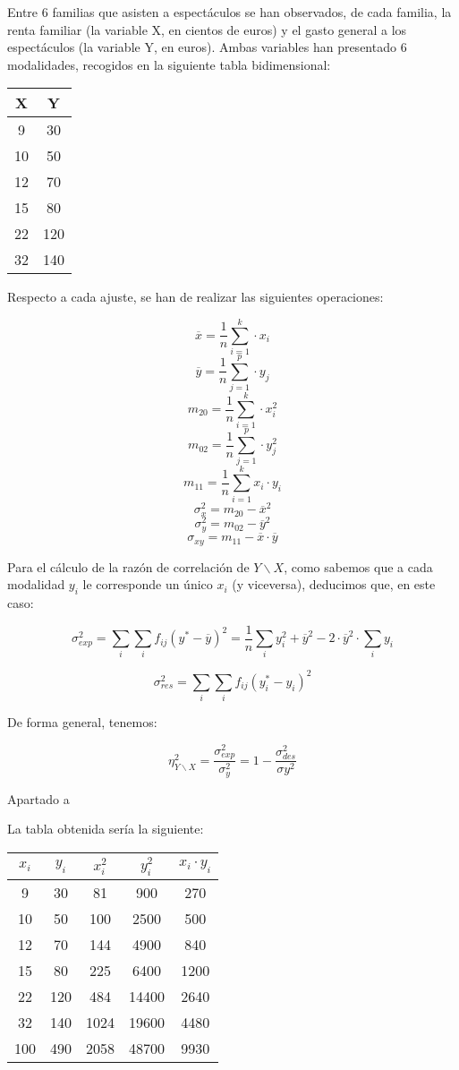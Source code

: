 \documentclass{article}
\begin{document}
Entre 6 familias que asisten a espectáculos se han observados, de cada familia, la renta familiar (la variable X, en cientos de euros) y el gasto general a los espectáculos (la variable Y, en euros). Ambas variables han presentado 6 modalidades, recogidos en la siguiente tabla bidimensional: 

\begin{center}
	
\begin{tabular}{c|c}
	
	X & Y \\ \hline
	9 & 30 \\ 
	10 & 50 \\ 
	12 & 70 \\ 
	15 & 80 \\ 
	22 & 120 \\ 
	32 & 140 \\ 
\end{tabular}
\end{center}

Respecto a cada ajuste, se han de realizar las siguientes operaciones:

$$\overline{x} = \frac{1}{n}\sum_{i=1}^{k}·x_i$$
$$\overline{y} = \frac{1}{n}\sum_{j=1}^{p}·y_j$$
$$m_{20} = \frac{1}{n}\sum_{i=1}^{k}·x_i^2$$
$$m_{02} = \frac{1}{n}\sum_{j=1}^{p}·y_j^2$$
$$m_{11} = \frac{1}{n}\sum_{i=1}^{k}x_i·y_i$$
$$ \sigma_x^2 = m_{20} - \overline{x}^2$$
$$ \sigma_y^2 = m_{02} - \overline{y}^2$$
$$ \sigma_{xy} = m_{11} - \overline{x}·\overline{y}$$

Para el cálculo de la razón de correlación de $Y\backslash X$, como sabemos que a cada modalidad $y_i$ le corresponde un único $x_i$ (y viceversa), deducimos que, en este caso:

$$\sigma_{exp}^2 = \sum_{i}\sum_{i}f_{ij}(y^*-\overline{y})^2 = \frac{1}{n}\sum_{i}y_i^2 + \overline y^2 - 2·\overline y^2·\sum_{i}y_i$$

$$\sigma_{res}^2 = \sum_{i}\sum_{i}f_{ij}(y_i^*-y_i)^2$$

De forma general, tenemos:

$$\eta_{Y\backslash X}^2 = \frac{\sigma_{exp}^2}{\sigma_{y}^2} = 1 - \frac{\sigma_{des}^2}{\sigma{y}^2}$$

Apartado a

La tabla obtenida sería la siguiente: 

\begin{center}
	\begin{tabular}{ c|c|c|c|c }
	
	$x_i$ & $y_i$ & $x_i^2$ & $y_i^2$ & $x_i·y_i$ \\ \hline
	9 & 30 & 81 & 900 & 270 \\ 
	10 & 50 & 100 & 2500 & 500 \\ 
	12 & 70 & 144 & 4900 & 840 \\ 
	15 & 80 & 225 & 6400 & 1200 \\ 
	22 & 120 & 484 & 14400 & 2640 \\ 
	32 & 140 & 1024 & 19600 & 4480 \\ \hline
	100 & 490 & 2058 & 48700 & 9930 \\ 
\end{tabular}
\end{center}
\end{document}
